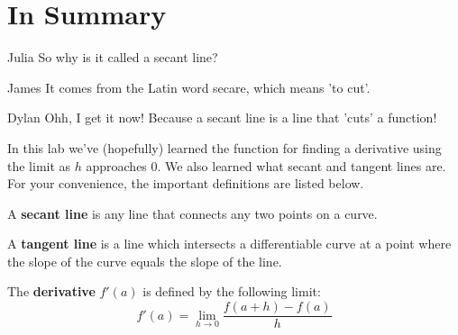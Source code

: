 \documentclass{ximera}
\begin{document}
\section{In Summary}
\begin{dialogue}
\item[Julia] So why is it called a secant line?
\item[James] It comes from the Latin word secare, which means 'to cut'.
\item[Dylan] Ohh, I get it now! Because a secant line is a line that 'cuts' a function!
\end{dialogue}
In this lab we've (hopefully) learned the function for finding a derivative using the limit as $h$ approaches 0. We also learned what secant and tangent lines are. For your convenience, the important definitions are listed below.
\begin{definition}
 A \textbf{secant line} is any line that connects any two points on a curve.
\end{definition}
\begin{definition}
A \textbf{tangent line} is a line which intersects a differentiable curve at a point where the slope of the curve equals the slope of the line.
\end{definition}
\begin{definition}
The \textbf{derivative} $f'(a)$ is defined by the following limit:
$$f'(a)=\displaystyle \lim_{h\rightarrow 0} \frac{f(a+h)-f(a)}{h}$$
\end{definition}
\end{document}
